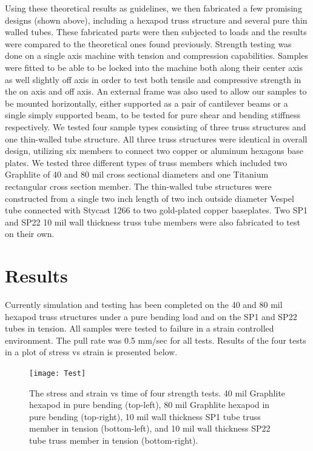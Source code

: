 \documentclass[final]{svjour2}
\begin{document}
Using these theoretical results as guidelines, we then fabricated a few promising designs (shown above), including a hexapod truss structure and several pure thin walled tubes. These fabricated parts were then subjected to loads and the results were compared to the theoretical ones found previously.  Strength testing was done on a single axis machine with tension and compression capabilities. Samples were fitted to be able to be locked into the machine both along their center axis as well slightly off axis in order to test both tensile and compressive strength in the on axis and off axis.  An external frame was also used to allow our samples to be mounted horizontally, either supported as a pair of cantilever beams or a single simply supported beam, to be tested for pure shear and bending stiffness respectively.  We tested four sample types consisting of three truss structures and one thin-walled tube structure.  All three truss structures were identical in overall design, utilizing six members to connect two copper or aluminum hexagons base plates.  We tested three different types of truss members which included two Graphlite of 40 and 80 mil cross sectional diameters and one Titanium rectangular cross section member. The thin-walled tube structures were constructed from a single two inch length of two inch outside diameter Vespel tube connected with Stycast 1266 to two gold-plated copper baseplates. Two SP1 and SP22 10 mil wall thickness truss tube members were also fabricated to test on their own.

\section{Results}
Currently simulation and testing has been completed on the 40 and 80 mil hexapod truss structures under a pure bending load and on the SP1 and SP22 tubes in tension.  
All samples were tested to failure in a strain controlled environment.  The pull rate was 0.5 mm/sec for all tests.  Results of the four tests in a plot of stress vs strain is presented below.

\begin{figure}[!ht]
\begin{center}
\texttt{[image: Test]}
\end{center}
\caption{The stress and strain vs time of four strength tests. 40 mil Graphlite hexapod in pure bending (top-left), 80 mil Graphlite hexapod in pure bending (top-right), 10 mil wall thickness SP1 tube truss member in tension (bottom-left), and 10 mil wall thickness SP22 tube truss member in tension (bottom-right).}
\label{Test}
\end{figure}
\end{document}
